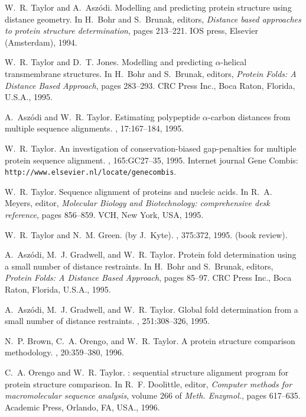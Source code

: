 \begin{thebibliography}{100}
W.~R. Taylor and A.~Asz\'{o}di.
\newblock Modelling and predicting protein structure using distance geometry.
\newblock In H.~Bohr and S.~Brunak, editors, {\em Distance based approaches to
  protein structure determination}, pages 213--221. IOS press, Elsevier
  (Amsterdam), 1994.

W.~R. Taylor and D.~T. Jones.
\newblock Modelling and predicting $\alpha$-helical transmembrane structures.
\newblock In H.~Bohr and S.~Brunak, editors, {\em Protein Folds: A Distance
  Based Approach}, pages 283--293. CRC Press Inc., Boca Raton, Florida, U.S.A.,
  1995.

A.~Asz\'{o}di and W.~R. Taylor.
\newblock Estimating polypeptide $\alpha$-carbon distances from multiple
  sequence alignments.
, 17:167--184, 1995.

W.~R. Taylor.
\newblock An investigation of conservation-biased gap-penalties for multiple
  protein sequence alignment.
, 165:GC27--35, 1995.
\newblock Internet journal Gene Combis: {\tt
  http://www.elsevier.nl/locate/genecombis}.

W.~R. Taylor.
\newblock Sequence alignment of proteins and nucleic acids.
\newblock In R.~A. Meyers, editor, {\em Molecular Biology and Biotechnology:
  comprehensive desk reference}, pages 856--859. VCH, New York, USA, 1995.

W.~R. Taylor and N.~M. Green.
 (by {J.~Kyte}).
, 375:372, 1995.
\newblock (book review).

A.~Asz\'{o}di, M.~J. Gradwell, and W.~R. Taylor.
\newblock Protein fold determination using a small number of distance
  restraints.
\newblock In H.~Bohr and S.~Brunak, editors, {\em Protein Folds: A Distance
  Based Approach}, pages 85--97. CRC Press Inc., Boca Raton, Florida, U.S.A.,
  1995.

A.~Asz\'{o}di, M.~J. Gradwell, and W.~R. Taylor.
\newblock Global fold determination from a small number of distance restraints.
, 251:308--326, 1995.

N.~P. Brown, C.~A. Orengo, and W.~R. Taylor.
\newblock A protein structure comparison methodology.
, 20:359--380, 1996.

C.~A. Orengo and W.~R. Taylor.
: sequential structure alignment program for protein structure
  comparison.
\newblock In R.~F. Doolittle, editor, {\em Computer methods for macromolecular
  sequence analysis}, volume 266 of {\em Meth. Enzymol.}, pages 617--635.
  Academic Press, Orlando, FA, USA., 1996.


\end{thebibliography}

